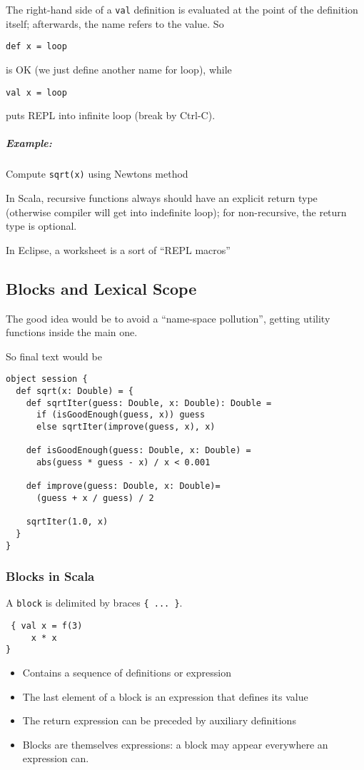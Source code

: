 \documentclass{scrartcl}
\newcommand{\example}{\subparagraph{Example:}} %
\newcommand{\term}[1]{\verb~#1~} %
\newcommand{\video}[1]{} %
\begin{document}
The right-hand side of a \lstinline|val| definition is evaluated at the point of
the definition itself; afterwards, the name refers to the value. So
\begin{lstlisting}
def x = loop
\end{lstlisting}
is OK (we just define another name for loop), while
\begin{lstlisting}
val x = loop
\end{lstlisting}
puts REPL into infinite loop (break by Ctrl-C). \video{2-5} \example Compute
\lstinline|sqrt(x)| using Newtons method

In Scala, recursive functions always should have an explicit return type
(otherwise compiler will get into indefinite loop); for non-recursive, the
return type is optional.

In Eclipse, a worksheet is a sort of ``REPL macros'' \video{2-6}

\subsection{Blocks and Lexical Scope}
\label{sec:BlocksAndScope}

The good idea would be to avoid a ``name-space pollution'', getting utility
functions inside the main one.

So final text would be
\begin{lstlisting}
object session {
  def sqrt(x: Double) = {
    def sqrtIter(guess: Double, x: Double): Double =
      if (isGoodEnough(guess, x)) guess
      else sqrtIter(improve(guess, x), x)

    def isGoodEnough(guess: Double, x: Double) = 
      abs(guess * guess - x) / x < 0.001

    def improve(guess: Double, x: Double)=
      (guess + x / guess) / 2

    sqrtIter(1.0, x)
  }
}
\end{lstlisting}

\subsubsection{Blocks in Scala}
\label{sec:BlocksAndScope}

A \term{block} is delimited by braces \lstinline|{ ... }|.
\begin{lstlisting}
 { val x = f(3) 
     x * x
}
\end{lstlisting}
\begin{itemize}
\item Contains a sequence of definitions or expression
\item The last element of a block is an expression that defines its value
\item The return expression can be preceded by auxiliary definitions
\item Blocks are themselves expressions: a block may appear everywhere an
  expression can.
\end{itemize}
\end{document}
